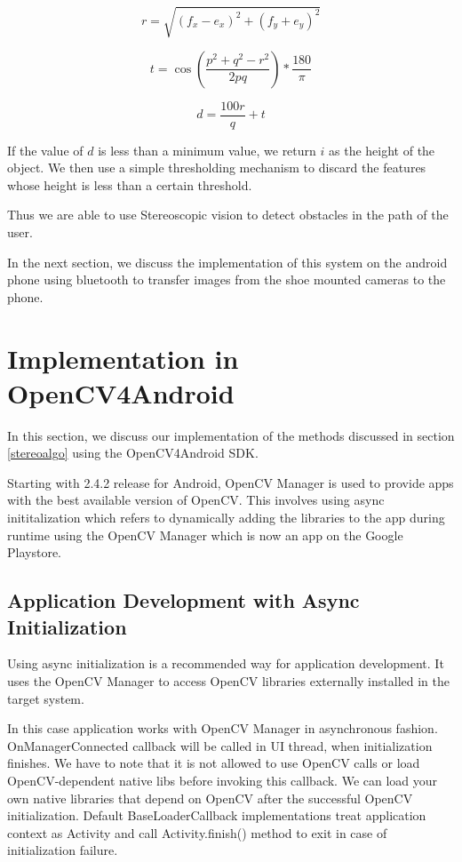 \documentclass[11pt]{report}
\begin{document}
{{\begin{equation}
r = \sqrt{(f_x - e_x)^2 + (f_y + e_y)^2}
\end{equation} 

\begin{equation}
t = \cos(\frac{p^2+q^2-r^2}{2pq}) *\frac{180}{\pi}
\end{equation} 

\begin{equation}
d= \frac{100r}{q} + t
\end{equation}

If the value of $d$ is less than a minimum value, we return $i$ as the height of the object. We then use a simple thresholding mechanism to discard the features whose height is less than a certain threshold.

Thus we are able to use Stereoscopic vision to detect obstacles in the path of the user.

In the next section, we discuss the implementation of this system on the android phone using bluetooth to transfer images from the shoe mounted cameras to the phone.

\section{Implementation in OpenCV4Android}

In this section, we discuss our implementation of the methods discussed in section \ref{stereoalgo} using the OpenCV4Android SDK. 

Starting with 2.4.2 release for Android, OpenCV Manager is used to provide apps with the best available version of OpenCV. This involves using async inititalization which refers to dynamically adding the libraries to the app during runtime using the OpenCV Manager which is now an app on the Google Playstore\cite{playstore}.

\subsection{Application Development with Async Initialization}

Using async initialization is a recommended way for application development. It uses the OpenCV Manager to access OpenCV libraries externally installed in the target system.

In this case application works with OpenCV Manager in asynchronous fashion. OnManagerConnected callback will be called in UI thread, when initialization finishes. We have to note that it is not allowed to use OpenCV calls or load OpenCV-dependent native libs before invoking this callback. We can load your own native libraries that depend on OpenCV after the successful OpenCV initialization. Default BaseLoaderCallback implementations treat application context as Activity and call Activity.finish() method to exit in case of initialization failure.

}}
\end{document}
